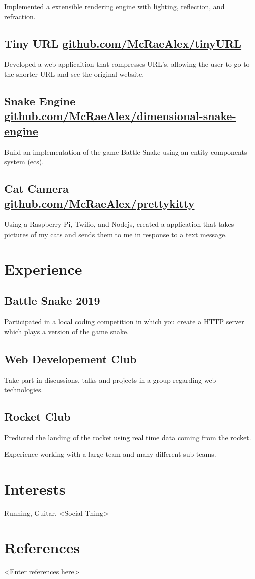 \documentclass{article}
\begin{document}
Implemented a extensible rendering engine with lighting, reflection, and 
refraction.

\subsection{Tiny URL \href{github.com/McRaeAlex/tinyURL}{github.com/McRaeAlex/tinyURL}}

Developed a web applicaition that compresses URL's, allowing the user to go to 
the shorter URL and see the original website.

\subsection{Snake Engine \href{github.com/McRaeAlex/dimensional-snake-engine}{github.com/McRaeAlex/dimensional-snake-engine}}

Build an implementation of the game Battle Snake using an entity components
system (ecs).

\subsection{Cat Camera \href{github.com/McRaeAlex/prettykitty}{github.com/McRaeAlex/prettykitty}}

Using a Raspberry Pi, Twilio, and Nodejs, created a application that takes 
pictures of my cats and sends them to me in response to a text message.

\section{Experience}


\subsection{Battle Snake 2019}

Participated in a local coding competition in which you create a HTTP server
which plays a version of the game snake.

\subsection{Web Developement Club}

Take part in discussions, talks and projects in a group regarding web 
technologies.

\subsection{Rocket Club}

Predicted the landing of the rocket using real time data coming from the rocket.

Experience working with a large team and many different sub teams.

\section{Interests}

Running, Guitar, <Social Thing>

\section{References}

<Enter references here>
\end{document}
